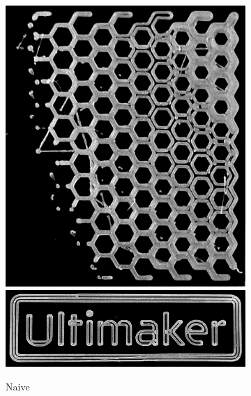 \begin{figure}
\centering
\setlength{\figheight}{.38\columnwidth}
\setlength{\figwidth}{0.32\columnwidth}
\begin{subfigure}{\figwidth}\centering
\includegraphics[height=\figheight]{sources/applications/P3_print_hex_naive_edited.png}
\includegraphics[width=\figwidth]{sources/applications/P3_print_UM_naive_edited.png}
\caption{Naive}\label{print_naive}
\end{subfigure}
\begin{subfigure}{\figwidth}\centering

\end{subfigure}
\end{figure}
